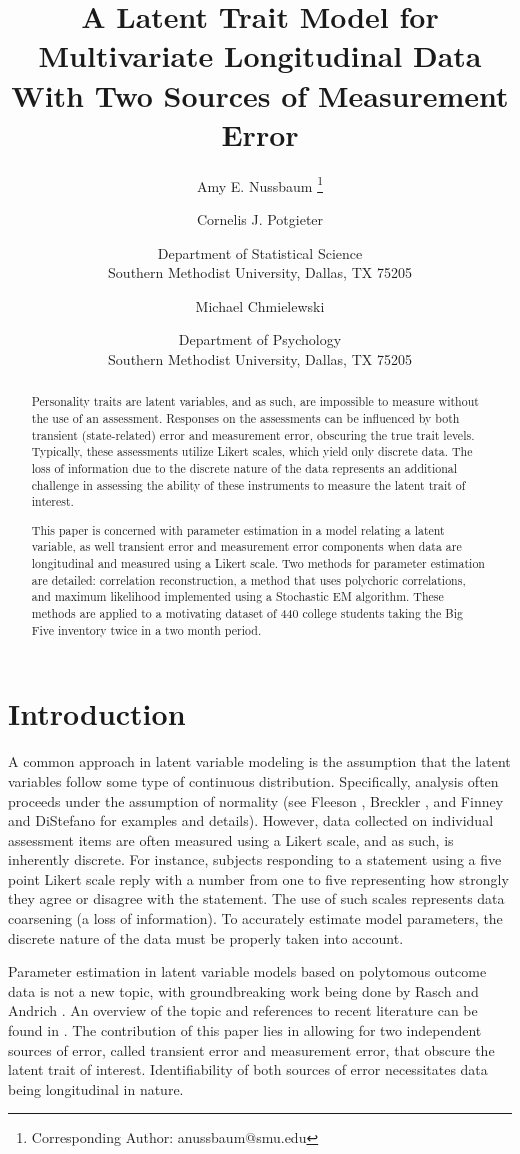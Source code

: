 \documentclass[12pt]{article}
\title{A Latent Trait Model for Multivariate Longitudinal Data With Two Sources of Measurement Error}
\author{Amy E. Nussbaum \thanks{Corresponding Author: anussbaum@smu.edu}
	\and Cornelis J. Potgieter 
	\and Department of Statistical Science \\ Southern Methodist University, Dallas, TX 75205
\and Michael Chmielewski
\and Department of Psychology\\ Southern Methodist University, Dallas, TX 75205}
\date{}
\begin{document}
\maketitle
\begin{abstract}
	Personality traits are latent variables, and as such, are impossible to
measure without the use of an assessment. Responses on the assessments can
be influenced by both transient (state-related) error and measurement error, obscuring the true trait levels. Typically, these assessments utilize Likert scales, which yield only discrete data. The loss of information due to the discrete nature of the data represents an additional challenge in assessing the ability of these instruments to measure the latent trait of interest.

This paper is concerned with parameter estimation in a model relating a latent variable, as well transient error and measurement error components when data are longitudinal and measured using a Likert scale. Two methods for parameter estimation are detailed: correlation reconstruction, a method that uses polychoric
correlations, and maximum likelihood implemented using a Stochastic EM algorithm. These methods are applied to a motivating dataset of 440
college students taking the Big Five inventory twice in a two month period.
\end{abstract}



\section{Introduction}

A common approach in latent variable modeling is the assumption that the
latent variables follow some type of continuous distribution. Specifically,
analysis often proceeds under the assumption of normality (see Fleeson \cite%
{Fleeson01}, Breckler \cite{Breckler90}, and Finney and DiStefano \cite%
{Finney06} for examples and details). However, data collected on individual
assessment items are often measured using a Likert scale, and as such, is
inherently discrete. For instance, subjects responding to a statement using
a five point Likert scale reply with a number from one to five representing
how strongly they agree or disagree with the statement. The use of such
scales represents data coarsening (a loss of information). To accurately estimate model parameters, the discrete nature of the data must be properly taken into account.

Parameter estimation in latent variable models based on polytomous outcome data is not a new topic, with groundbreaking work being done by Rasch \cite{Rasch61} and Andrich \cite{Andrich78}. An overview of the topic and references to recent literature can be found in \cite{Bartholomew01}. The contribution of this paper lies in allowing for two independent sources of error, called transient error and measurement error, that obscure the latent trait of interest. Identifiability of both sources of error necessitates data being longitudinal in nature. 
\end{document}
